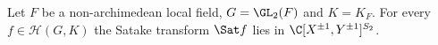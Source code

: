 Let $F$ be a non-archimedean local field, $G=\GL_2(F)$ and $K=K_F$. For every $f\in\mathcal H(G,K)$ the Satake
transform $\Sat f$ lies in $\C[X^{\pm1},Y^{\pm1}]^{S_2}$.
